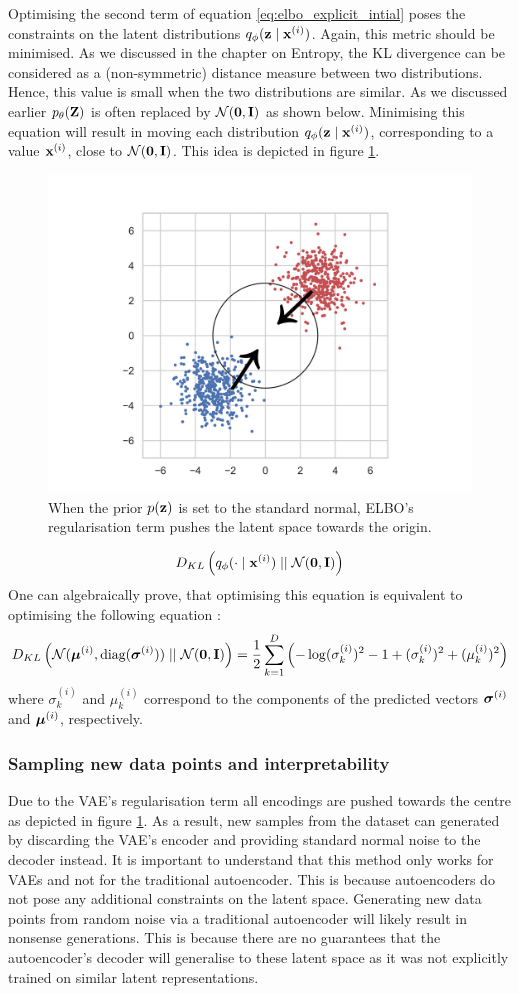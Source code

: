	
	Optimising the second term of equation \ref{eq:elbo_explicit_intial} poses the constraints on the latent distributions $q_\phi (\mathbf{z} \mid \mathbf{x}^{(i)})$. Again, this metric should be minimised. As we discussed in the chapter on Entropy, the KL divergence can be considered as a (non-symmetric) distance measure between two distributions. Hence, this value is small when the two distributions are similar. As we discussed earlier $p_\theta(\mathbf{Z})$ is often replaced by $\mathcal{N}(\bm{\mathbf{0}}, \mathbf{I})$ as shown below. Minimising this equation will result in moving each distribution $q_\phi (\mathbf{z} \mid \mathbf{x}^{(i)})$, corresponding to a value $\mathbf{x}^{(i)}$, close to $\mathcal{N}(\bm{\mathbf{0}}, \mathbf{I})$. This idea is depicted in figure \ref{fig:twogaussiandistributions}.
	\begin{figure}
		\centering
		\includegraphics[width=0.7\linewidth]{two_gaussian_distributions}
		\caption{When the prior $p(\mathbf{z})$ is set to the standard normal, ELBO's regularisation term pushes the latent space towards the origin.}
		\label{fig:twogaussiandistributions}
	\end{figure}
	$$
	D_{KL} \left(  q_\phi (\cdot \mid \mathbf{x}^{(i)})  \mid \mid  \mathcal{N}(\bm{\mathbf{0}}, \mathbf{I})  \right)
	$$
	One can algebraically prove, that optimising this equation is equivalent to optimising the following equation \cite{kingmaAutoEncodingVariationalBayes2022}: 
	\begin{equation}	
		D_{KL} \left( \mathcal{N}(\bm{\mu}^{(i)}, \text{diag}(\bm{\sigma}^{(i)})) \mid \mid \mathcal{N}(\bm{\mathbf{0}}, \mathbf{I}) \right) = \frac{1}{2} \sum_{k=1}^{D} \left( -\log (\sigma_k^{(i)})^2 - 1 + (\sigma_k^{(i)})^2 + (\mu_k^{(i)})^2 \right)
	\end{equation}
	where $\sigma_k^{(i)}$ and $\mu_k^{(i)}$ correspond to the components of the predicted vectors $\bm{\sigma}^{(i)}$ and $\bm{\mu}^{(i)}$, respectively.
	
	


\subsubsection{Sampling new data points and interpretability}	
	Due to the VAE's regularisation term all encodings are pushed towards the centre as depicted in figure \ref{fig:twogaussiandistributions}. As a result, new samples from the dataset can generated by discarding the VAE's encoder and providing standard normal noise to the decoder instead. It is important to understand that this method only works for VAEs and not for the traditional autoencoder. This is because autoencoders do not pose any additional constraints on the latent space. Generating new data points from random noise via a traditional autoencoder will likely result in nonsense generations. This is because there are no guarantees that the autoencoder's decoder will generalise to these latent space as it was not explicitly trained on similar latent representations.
	
